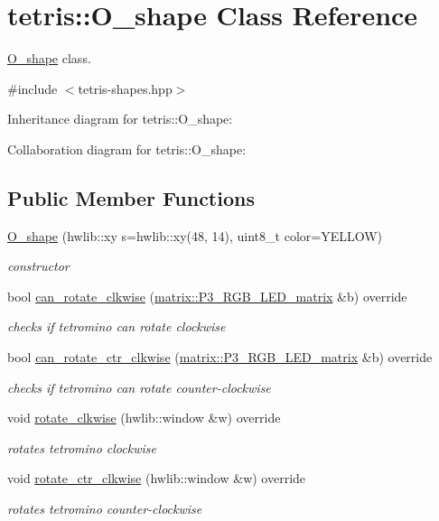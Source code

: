 \hypertarget{classtetris_1_1O__shape}{}\section{tetris\+:\+:O\+\_\+shape Class Reference}
\label{classtetris_1_1O__shape}


\hyperlink{classtetris_1_1O__shape}{O\+\_\+shape} class.  




{\ttfamily \#include $<$tetris-\/shapes.\+hpp$>$}



Inheritance diagram for tetris\+:\+:O\+\_\+shape\+:


Collaboration diagram for tetris\+:\+:O\+\_\+shape\+:
\subsection*{Public Member Functions}
\begin{DoxyCompactItemize}
\item 
\hyperlink{classtetris_1_1O__shape_a67c89bc9c13434b8ae34427434b4fba3}{O\+\_\+shape} (hwlib\+::xy s=hwlib\+::xy(48, 14), uint8\+\_\+t color=Y\+E\+L\+L\+OW)
\begin{DoxyCompactList}\small\item\em constructor \end{DoxyCompactList}\item 
bool \hyperlink{classtetris_1_1O__shape_a92c7b336c7d3f696f24b8675ec9faed9}{can\+\_\+rotate\+\_\+clkwise} (\hyperlink{classmatrix_1_1P3__RGB__LED__matrix}{matrix\+::\+P3\+\_\+\+R\+G\+B\+\_\+\+L\+E\+D\+\_\+matrix} \&b) override
\begin{DoxyCompactList}\small\item\em checks if tetromino can rotate clockwise \end{DoxyCompactList}\item 
bool \hyperlink{classtetris_1_1O__shape_ae53421645f59627b6c6c7d26a59f2d6a}{can\+\_\+rotate\+\_\+ctr\+\_\+clkwise} (\hyperlink{classmatrix_1_1P3__RGB__LED__matrix}{matrix\+::\+P3\+\_\+\+R\+G\+B\+\_\+\+L\+E\+D\+\_\+matrix} \&b) override
\begin{DoxyCompactList}\small\item\em checks if tetromino can rotate counter-\/clockwise \end{DoxyCompactList}\item 
void \hyperlink{classtetris_1_1O__shape_ad7372dc4b9b832ba1fe90488b15de95f}{rotate\+\_\+clkwise} (hwlib\+::window \&w) override
\begin{DoxyCompactList}\small\item\em rotates tetromino clockwise \end{DoxyCompactList}\item 
void \hyperlink{classtetris_1_1O__shape_adc8c727b5ae2ea3905ff70107be511bd}{rotate\+\_\+ctr\+\_\+clkwise} (hwlib\+::window \&w) override
\begin{DoxyCompactList}\small\item\em rotates tetromino counter-\/clockwise \end{DoxyCompactList}\end{DoxyCompactItemize}
